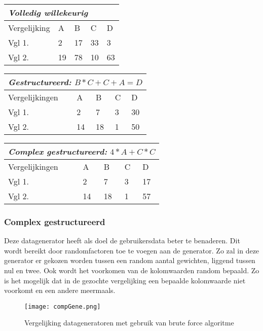\documentclass[Main.tex]{subfiles}
\begin{document}
\begin{center}
\begin{tabular}{@{} *5l @{}}    \toprule
\multicolumn{5}{l}{\emph{Volledig willekeurig}}\\\midrule
 Vergelijking & A  & B  & C  & D  \\ 
 Vgl 1. & 2 & 17 & 33 & 3\\ 
 Vgl 2. & 19 & 78 & 10 & 63\\\bottomrule
 \hline
\end{tabular}

\begin{tabular}{@{} *5l @{}}    \toprule
\multicolumn{5}{l}{\emph{Gestructureerd: } $B*C+C+A = D$} \\ \midrule
 Vergelijkingen & A  & B  & C  & D  \\ 
 Vgl 1. & 2 & 7 & 3 & 30\\ 
 Vgl 2. & 14 & 18 & 1 & 50\\\bottomrule
 \hline
\end{tabular}

\begin{tabular}{@{} *5l @{}}    \toprule
\multicolumn{5}{l}{\emph{Complex gestructureerd:}  $4*A+C*C$}\\\midrule
 Vergelijkingen & A  & B  & C  & D  \\ 
 Vgl 1. & 2 & 7 & 3 & 17\\ 
 Vgl 2. & 14 & 18 & 1 & 57\\\bottomrule
 \hline
\end{tabular}
\end{center}

\subsubsection*{Complex gestructureerd}
Deze datagenerator heeft als doel de gebruikersdata beter te benaderen. Dit wordt bereikt door randomfactoren toe te voegen aan de generator. Zo zal in deze generator er gekozen worden tussen een random aantal gewichten, liggend tussen nul en twee. Ook wordt het voorkomen van de kolomwaarden random bepaald. Zo is het mogelijk dat in de gezochte vergelijking een bepaalde kolomwaarde niet voorkomt en een andere meermaals.

\begin{figure}
\centering
\texttt{[image: compGene.png]}
\caption{Vergelijking datageneratoren met gebruik van brute force algoritme} \label{fig:datageneratoren}
\end{figure}
\end{document}
